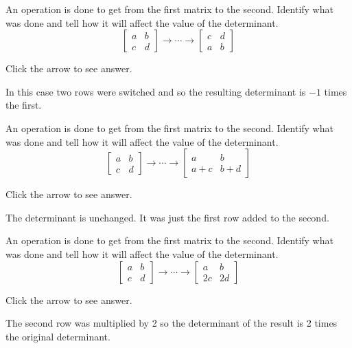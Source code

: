 \documentclass{ximera}
\begin{document}
\begin{problem}\label{prb:7.10} An operation is done to get from the first matrix to the second.
Identify what was done and tell how it will affect the value of the
determinant.
\begin{equation*}
\left[
\begin{array}{cc}
a & b \\
c & d
\end{array}
\right] \rightarrow \cdots \rightarrow \left[
\begin{array}{cc}
c & d \\
a & b
\end{array}
\right]
\end{equation*}

Click the arrow to see answer.
\begin{expandable}
In this case two rows were switched and so the resulting determinant is $-1$
times the first.
\end{expandable}
\end{problem}


\begin{problem}\label{prb:7.11} An operation is done to get from the first matrix to the second.
Identify what was done and tell how it will affect the value of the
determinant.
\begin{equation*}
\left[
\begin{array}{cc}
a & b \\
c & d
\end{array}
\right] \rightarrow \cdots \rightarrow \left[
\begin{array}{cc}
a & b \\
a+c & b+d
\end{array}
\right]
\end{equation*}

Click the arrow to see answer.
\begin{expandable}
The determinant is unchanged. It was just the first row added to the second.
\end{expandable}
\end{problem}


\begin{problem}\label{prb:7.12} An operation is done to get from the first matrix to the second.
Identify what was done and tell how it will affect the value of the
determinant.
\begin{equation*}
\left[
\begin{array}{cc}
a & b \\
c & d
\end{array}
\right] \rightarrow \cdots \rightarrow \left[
\begin{array}{cc}
a & b \\
2c & 2d
\end{array}
\right]
\end{equation*}

Click the arrow to see answer.
\begin{expandable}
The second row was multiplied by 2 so the determinant of the result is 2
times the original determinant.
\end{expandable}
\end{problem}
\end{document}
